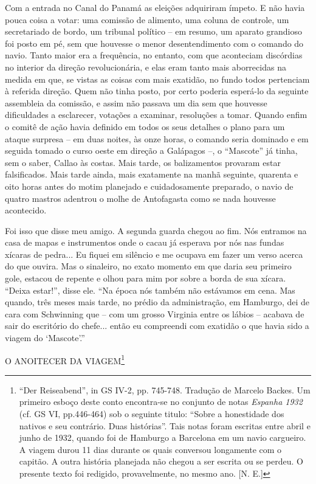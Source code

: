 Com a entrada no Canal do Panamá as eleições adquiriram ímpeto. E não
havia pouca coisa a votar: uma comissão de alimento, uma coluna de
controle, um secretariado de bordo, um tribunal político -- em resumo,
um aparato grandioso foi posto em pé, sem que houvesse o menor
desentendimento com o comando do navio. Tanto maior era a frequência, no
entanto, com que aconteciam discórdias no interior da direção
revolucionária, e elas eram tanto mais aborrecidas na medida em que, se
vistas as coisas com mais exatidão, no fundo todos pertenciam à referida
direção. Quem não tinha posto, por certo poderia esperá-lo da seguinte
assembleia da comissão, e assim não passava um dia sem que houvesse
dificuldades a esclarecer, votações a examinar, resoluções a tomar.
Quando enfim o comitê de ação havia definido em todos os seus detalhes o
plano para um ataque surpresa -- em duas noites, às onze horas, o
comando seria dominado e em seguida tomado o curso oeste em direção a
Galápagos --, o ``Mascote'' já tinha, sem o saber, Callao às costas.
Mais tarde, os balizamentos provaram estar falsificados. Mais tarde
ainda, mais exatamente na manhã seguinte, quarenta e oito horas antes do
motim planejado e cuidadosamente preparado, o navio de quatro mastros
adentrou o molhe de Antofagasta como se nada houvesse acontecido.

Foi isso que disse meu amigo. A segunda guarda chegou ao fim. Nós
entramos na casa de mapas e instrumentos onde o cacau já esperava por
nós nas fundas xícaras de pedra... Eu fiquei em silêncio e me ocupava em
fazer um verso acerca do que ouvira. Mas o sinaleiro, no exato momento
em que daria seu primeiro gole, estacou de repente e olhou para mim por
sobre a borda de sua xícara. ``Deixa estar!'', disse ele. ``Na época nós
também não estávamos em cena. Mas quando, três meses mais tarde, no
prédio da administração, em Hamburgo, dei de cara com Schwinning que --
com um grosso Virginia entre os lábios -- acabava de sair do escritório
do chefe... então eu compreendi com exatidão o que havia sido a viagem
do `Mascote'.''

O ANOITECER DA VIAGEM\footnote{``Der Reiseabend'', in GS IV-2, pp.
  745-748. Tradução de Marcelo Backes. Um primeiro esboço deste conto
  encontra-se no conjunto de notas \emph{Espanha 1932} (cf. GS VI,
  pp.446-464) sob o seguinte titulo: ``Sobre a honestidade dos nativos e
  seu contrário. Duas histórias''. Tais notas foram escritas entre abril
  e junho de 1932, quando foi de Hamburgo a Barcelona em um navio
  cargueiro. A viagem durou 11 dias durante os quais conversou
  longamente com o capitão. A outra história planejada não chegou a ser
  escrita ou se perdeu. O presente texto foi redigido, provavelmente, no
  mesmo ano. {[}N. E.{]}}

